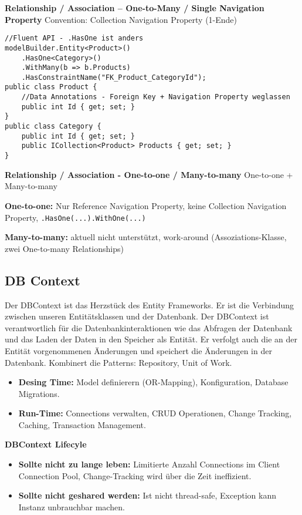 \textbf{Relationship / Association – One-to-Many / Single Navigation Property} Convention: Collection Navigation Property (1-Ende)
\begin{lstlisting}
//Fluent API - .HasOne ist anders
modelBuilder.Entity<Product>()
    .HasOne<Category>()
    .WithMany(b => b.Products)
    .HasConstraintName("FK_Product_CategoryId");
public class Product {
    //Data Annotations - Foreign Key + Navigation Property weglassen
    public int Id { get; set; }                         
}
public class Category {
    public int Id { get; set; }
    public ICollection<Product> Products { get; set; }
}
\end{lstlisting}

\textbf{Relationship / Association - One-to-one / Many-to-many} One-to-one + Many-to-many

\textbf{One-to-one:} Nur Reference Navigation Property, keine Collection Navigation Property, \lstinline|.HasOne(...).WithOne(...)|

\textbf{Many-to-many:} aktuell nicht unterstützt, work-around (Assoziations-Klasse, zwei One-to-many Relationships)


\subsection{DB Context}
Der DBContext ist das Herzstück des Entity Frameworks. Er ist die Verbindung zwischen unseren Entitätsklassen und der Datenbank. Der DBContext ist verantwortlich für die Datenbankinteraktionen wie das Abfragen der Datenbank und das Laden der Daten in den Speicher als Entität. Er verfolgt auch die an der Entität vorgenommenen Änderungen und speichert die Änderungen in der Datenbank. Kombinert die Patterns: Repository, Unit of Work.

\begin{itemize}
	\item \textbf{Desing Time:} Model definierern (OR-Mapping), Konfiguration, Database Migrations.
	\item \textbf{Run-Time:} Connections verwalten, CRUD Operationen, Change Tracking, Caching, Transaction Management.
\end{itemize}

\textbf{DBContext Lifecyle}
\begin{itemize}
	\item \textbf{Sollte nicht zu lange leben:} Limitierte Anzahl Connections im Client Connection Pool, Change-Tracking wird über die Zeit ineffizient.
	\item \textbf{Sollte nicht geshared werden:} Ist nicht thread-safe, Exception kann Instanz unbrauchbar machen.
\end{itemize}

